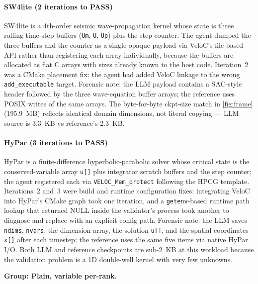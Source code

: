 \documentclass[conference]{IEEEtran}
\begin{document}
\paragraph{SW4lite (2 iterations to PASS)}
SW4lite is a 4th-order seismic wave-propagation kernel whose state is three rolling time-step buffers (\texttt{Um}, \texttt{U}, \texttt{Up}) plus the step counter. The agent dumped the three buffers and the counter as a single opaque payload via VeloC's file-based API rather than registering each array individually, because the buffers are allocated as flat C arrays with sizes already known to the host code. Iteration~2 was a CMake placement fix: the agent had added VeloC linkage to the wrong \texttt{add\_executable} target. Forensic note: the LLM payload contains a SAC-style header followed by the three wave-equation buffer arrays; the reference uses POSIX writes of the same arrays. The byte-for-byte ckpt-size match in \autoref{fig:frame} (195.9~MB) reflects identical domain dimensions, not literal copying --- LLM source is 3.3~KB vs reference's 2.3~KB.

\paragraph{HyPar (3 iterations to PASS)}
HyPar is a finite-difference hyperbolic-parabolic solver whose critical state is the conserved-variable array \texttt{u[]} plus integrator scratch buffers and the step counter; the agent registered each via \texttt{VELOC\_Mem\_protect} following the HPCG template. Iterations~2 and~3 were build and runtime configuration fixes: integrating VeloC into HyPar's CMake graph took one iteration, and a \texttt{getenv}-based runtime path lookup that returned NULL inside the validator's process took another to diagnose and replace with an explicit config path. Forensic note: the LLM saves \texttt{ndims}, \texttt{nvars}, the dimension array, the solution \texttt{u[]}, and the spatial coordinates \texttt{x[]} after each timestep; the reference uses the same five items via native HyPar I/O. Both LLM and reference checkpoints are sub-2~KB at this workload because the validation problem is a 1D double-well kernel with very few unknowns.

\smallskip\noindent\textbf{Group: Plain, variable per-rank.}
\end{document}
